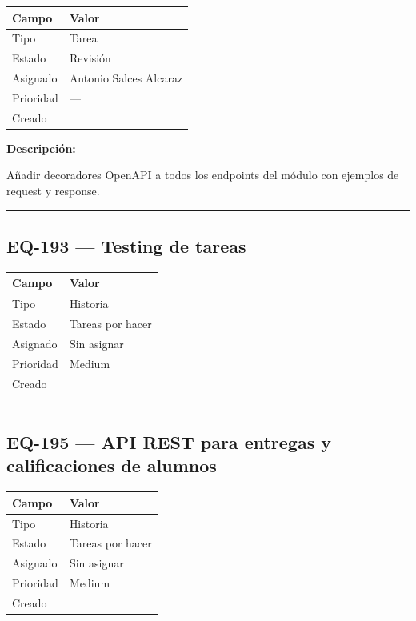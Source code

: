 \documentclass[
  spanish,
  11pt,
]{report}
\newcounter{none} %
\begin{document}
{\def\LTcaptype{none} %
\begin{longtable}[]{@{}ll@{}}
\toprule\noalign{}
Campo & Valor \\
\midrule\noalign{}
\endhead
\bottomrule\noalign{}
\endlastfoot
Tipo & Tarea \\
Estado & Revisión \\
Asignado & Antonio Salces Alcaraz \\
Prioridad & --- \\
Creado & \\
\end{longtable}
}

\textbf{Descripción:}

Añadir decoradores OpenAPI a todos los endpoints del módulo con ejemplos
de request y response.

\begin{center}\rule{0.5\linewidth}{0.5pt}\end{center}

\subsection{EQ-193 --- Testing de
tareas}\label{eq-193-testing-de-tareas}

{\def\LTcaptype{none} %
\begin{longtable}[]{@{}ll@{}}
\toprule\noalign{}
Campo & Valor \\
\midrule\noalign{}
\endhead
\bottomrule\noalign{}
\endlastfoot
Tipo & Historia \\
Estado & Tareas por hacer \\
Asignado & Sin asignar \\
Prioridad & Medium \\
Creado & \\
\end{longtable}
}

\begin{center}\rule{0.5\linewidth}{0.5pt}\end{center}

\subsection{EQ-195 --- API REST para entregas y calificaciones de
alumnos}\label{eq-195-api-rest-para-entregas-y-calificaciones-de-alumnos}

{\def\LTcaptype{none} %
\begin{longtable}[]{@{}ll@{}}
\toprule\noalign{}
Campo & Valor \\
\midrule\noalign{}
\endhead
\bottomrule\noalign{}
\endlastfoot
Tipo & Historia \\
Estado & Tareas por hacer \\
Asignado & Sin asignar \\
Prioridad & Medium \\
Creado & \\
\end{longtable}
}
\end{document}
